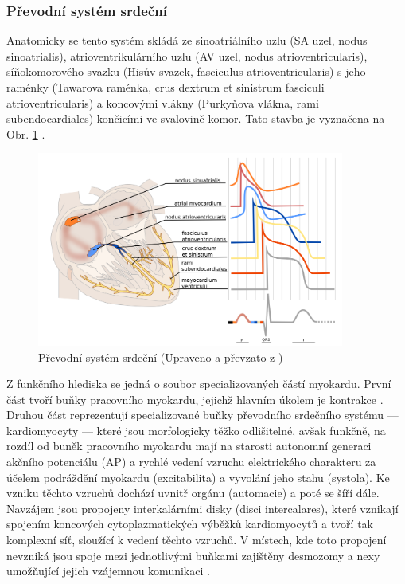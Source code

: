 \subsubsection{Převodní systém srdeční}
\label{section:pss}
Anatomicky se tento systém skládá ze sinoatriálního uzlu (SA uzel, nodus
sinoatrialis), atrioventrikulárního uzlu (AV uzel, nodus atrioventricularis),
síňokomorového svazku (Hisův svazek, fasciculus atrioventricularis) s jeho
raménky (Tawarova raménka, crus dextrum et sinistrum fasciculi
atrioventricularis) a koncovými vlákny (Purkyňova vlákna, rami subendocardiales)
končicími ve svalovině komor. Tato stavba je vyznačena na Obr. \ref{fig:pss}
\cite{Dylevsky2013}.

\begin{figure}[h]
	\begin{center}
		\includegraphics[width=0.9\textwidth]{../assets/anatomy/pss}
		\caption{Převodní systém srdeční (Upraveno a převzato z
			\cite{ecgpediaConduction})}
		\label{fig:pss}
	\end{center}
\end{figure}

Z funkčního hlediska se jedná o soubor specializovaných částí myokardu. První
část tvoří buňky pracovního myokardu, jejichž hlavním úkolem je kontrakce
\cite{Cihak2016}. Druhou část reprezentují specializované buňky převodního
srdečního systému --- kardiomyocyty --- které jsou morfologicky těžko
odlišitelné, avšak funkčně, na rozdíl od buněk pracovního myokardu mají na
starosti autonomní generaci akčního potenciálu (AP) a rychlé vedení vzruchu
elektrického charakteru za účelem podráždění myokardu (excitabilita) a vyvolání
jeho stahu (systola). Ke vzniku těchto vzruchů dochází uvnitř orgánu (automacie)
a poté se šíří dále. Navzájem jsou propojeny interkalárními disky (disci
intercalares), které vznikají spojením koncových cytoplazmatických výběžků
kardiomyocytů a tvoří tak komplexní síť, sloužící k vedení těchto vzruchů. V
místech, kde toto propojení nevzniká jsou spoje mezi jednotlivými buňkami
zajištěny desmozomy a nexy umožňující jejich vzájemnou komunikaci
\cite{Dylevsky2013, Stejfa2006}.

